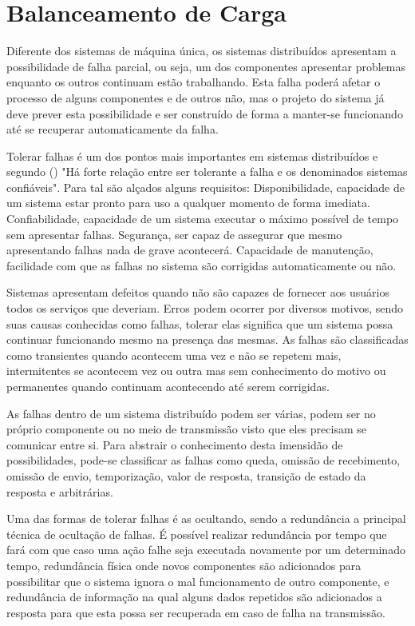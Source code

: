 \section{Balanceamento de Carga}
	Diferente dos sistemas de máquina única, os sistemas distribuídos apresentam a possibilidade de falha parcial, ou seja, um dos componentes apresentar problemas enquanto os outros continuam estão trabalhando. Esta falha poderá afetar o processo de alguns componentes e de outros não, mas o projeto do sistema já deve prever esta possibilidade e ser construído de forma a manter-se funcionando até se recuperar automaticamente da falha.
	
	Tolerar falhas é um dos pontos mais importantes em sistemas distribuídos e segundo  (\citeyear{Tanenbaum}) "Há forte relação entre ser tolerante a falha e os denominados sistemas confiáveis". Para tal são alçados alguns requisitos: Disponibilidade, capacidade de um sistema estar pronto para uso a qualquer momento de forma imediata. Confiabilidade, capacidade de um sistema executar o máximo possível de tempo sem apresentar falhas. Segurança, ser capaz de assegurar que mesmo apresentando falhas nada de grave acontecerá. Capacidade de manutenção, facilidade com que as falhas no sistema são corrigidas automaticamente ou não.
	
	Sistemas apresentam defeitos quando não são capazes de fornecer aos usuários todos os serviços que deveriam. Erros podem ocorrer por diversos motivos, sendo suas causas conhecidas como falhas, tolerar elas significa que um sistema possa continuar funcionando mesmo na presença das mesmas. As falhas são classificadas como transientes quando acontecem uma vez e não se repetem mais, intermitentes se acontecem vez ou outra mas sem conhecimento do motivo ou permanentes quando continuam acontecendo até serem corrigidas.
	
	As falhas dentro de um sistema distribuído podem ser várias, podem ser no próprio componente ou no meio de transmissão visto que eles precisam se comunicar entre si. Para abstrair o conhecimento desta imensidão de possibilidades, pode-se classificar as falhas como queda, omissão de recebimento, omissão de envio, temporização, valor de resposta, transição de estado da resposta e arbitrárias.
	
	Uma das formas de tolerar falhas é as ocultando, sendo a redundância a principal técnica de ocultação de falhas. É possível realizar redundância por tempo que fará com que caso uma ação falhe seja executada novamente por um determinado tempo, redundância física onde novos componentes são adicionados para possibilitar que o sistema ignora o mal funcionamento de outro componente, e redundância de informação na qual alguns dados repetidos são adicionados a resposta para que esta possa ser recuperada em caso de falha na transmissão.
	
